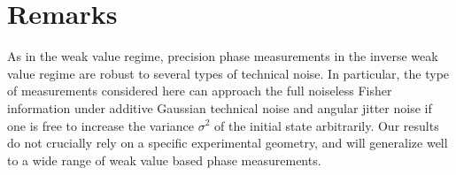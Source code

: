 \section{Remarks}
As in the weak value regime, precision phase measurements in the inverse weak value regime are robust to several types of technical noise.  In particular, the type of measurements considered here can approach the full noiseless Fisher information under additive Gaussian technical noise and angular jitter noise if one is free to increase the variance $\sigma^2$ of the initial state arbitrarily.  Our results do not crucially rely on a specific experimental geometry, and will generalize well to a wide range of weak value based phase measurements. 





